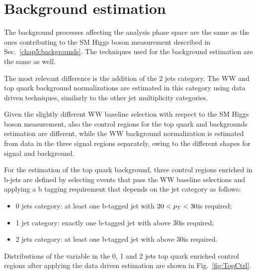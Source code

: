 \section{Background estimation}\label{chap6:Backgrounds}

The background processes affecting the analysis phase space are the same as the ones contributing to the SM Higgs boson measurement described in Sec.~\ref{chap5:backgrounds}. The techniques used for the background estimation are the same as well.

The most relevant difference is the addition of the 2 jets category. The WW and top quark background normalizations are estimated in this category using data driven techniques, similarly to the other jet multiplicity categories.

Given the slightly different WW baseline selection with respect to the SM Higgs boson measurement, also the control regions for the top quark and \dytt backgrounds estimation are different, while the WW background normalization is estimated from data in the three signal regions separately, owing to the different \mti shapes for signal and background.

For the estimation of the top quark background, three control regions enriched in b-jets are defined by selecting events that pass the WW baseline selections and applying a b tagging requirement that depends on the jet category as follows:
\begin{itemize}
\item 0 jets category: at least one b-tagged jet with $20 < p_\mathrm{T} < 30$\GeV is required;
\item 1 jet category: exactly one b-tagged jet with \pt above 30\GeV is required;
\item 2 jets category: at least one b-tagged jet with \pt above 30\GeV is required.
\end{itemize}
Distributions of the \mti variable in the 0, 1 and 2 jets top quark enriched control regions after applying the data driven estimation are shown in Fig.~\ref{fig:TopCtrl}.


